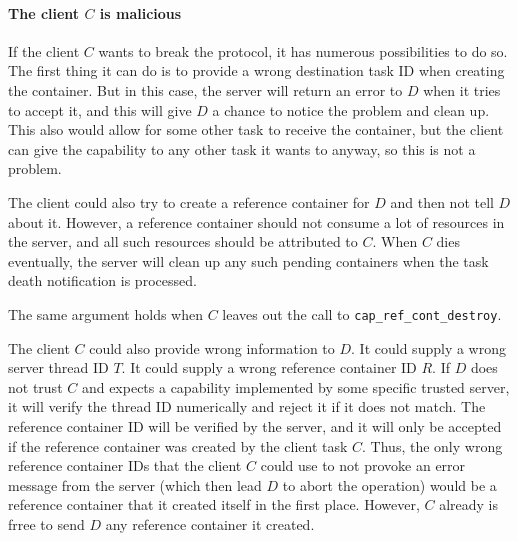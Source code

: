 \paragraph{The client $C$ is malicious}

If the client $C$ wants to break the protocol, it has numerous
possibilities to do so.  The first thing it can do is to provide a
wrong destination task ID when creating the container.  But in this
case, the server will return an error to $D$ when it tries to accept
it, and this will give $D$ a chance to notice the problem and clean
up.  This also would allow for some other task to receive the
container, but the client can give the capability to any other task it
wants to anyway, so this is not a problem.

\begin{comment}
  If a malicious behaviour results in an outcome that can also be
  achieved following the normal protocol with different parameters,
  then this not a problem at all.
\end{comment}

The client could also try to create a reference container for $D$ and
then not tell $D$ about it.  However, a reference container should not
consume a lot of resources in the server, and all such resources
should be attributed to $C$.  When $C$ dies eventually, the server
will clean up any such pending containers when the task death
notification is processed.

The same argument holds when $C$ leaves out the call to
\verb/cap_ref_cont_destroy/.

The client $C$ could also provide wrong information to $D$.  It could
supply a wrong server thread ID $T$.  It could supply a wrong
reference container ID $R$.  If $D$ does not trust $C$ and expects a
capability implemented by some specific trusted server, it will verify
the thread ID numerically and reject it if it does not match.  The
reference container ID will be verified by the server, and it will
only be accepted if the reference container was created by the client
task $C$.  Thus, the only wrong reference container IDs that the
client $C$ could use to not provoke an error message from the server
(which then lead $D$ to abort the operation) would be a reference
container that it created itself in the first place.  However, $C$
already is frree to send $D$ any reference container it created.

\begin{comment}
  Again $C$ can not achieve anything it could not achieve by just
  following the protocol as well.  If $C$ tries to use the same
  reference container with several RPCs in $D$, one of them would
  succeed and the others would fail, hurting only $C$.
  
  If $D$ does trust $C$, then it can not protect against malicious
  behaviour by $C$.
\end{comment}


